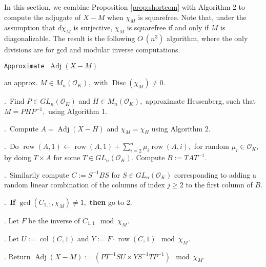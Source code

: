 \documentclass[sigconf]{acmart}
\DeclareMathOperator{\adj}{Adj}
\DeclareMathOperator{\disc}{Disc}
\DeclareMathOperator{\row}{row}
\DeclareMathOperator{\col}{col}
\newcommand{\OK}{\mathcal{O}_K}
\newcommand{\softO}{O\tilde{~}}
\theoremstyle{definition}
\begin{document}
In this section, we combine Proposition \ref{prop:shortcom}
with Algorithm 2 to compute the adjugate of $X{-}M$
when $\chi_M$ is squarefree.   Note that, under
the assumption that $d\chi_M$ is surjective,
$\chi_M$ is squarefree if and only if $M$ is diagonalizable.  The result is
the following $\softO(n^3)$ algorithm, where the only
divisions are for gcd and modular inverse computations.

\noindent\hrulefill

 {\tt Approximate $\adj (X{-}M)$ }

 an approx. $M \in M_n(\OK),$ with $\disc(\chi_M) \neq 0.$ 

\smallskip

.\ Find $P \in GL_n(\OK)$ and $H \in M_n(\OK),$ approximate Hessenberg,
such that $M=PHP^{-1},$ using Algorithm 1. 

.\ Compute $A=\adj (X-H)$ and $\chi_M = \chi_H$ using Algorithm 2.


.\ Do $\row(A,1) \leftarrow \row(A,1)+\sum_{i=2}^n \mu_i \row(A,i),$ for
random $\mu_i \in \OK,$ by doing $T \times A$ for some $T \in GL_n(\OK).$
Compute $B:=TAT^{-1}.$

.\ Similarily compute $C:=S^{-1}BS$ for $S \in GL_n(\OK)$ corresponding to
adding a random linear combination of the columns of index $j \ge 2$
to the first column of $B.$ 

.\  \textbf{If} $\gcd(C_{1,1}, \chi_M) \neq 1,$ \textbf{then} go to 2.

. Let $F$ be the inverse of $C_{1,1} \mod \chi_M$.

. Let $U := \col(C,1)$ and $Y := F \cdot \row(C,1) \mod \chi_M$.

. Return $\adj(X-M):=(PT^{-1}S U \times Y S^{-1} T P^{-1}) \mod \chi_M.$

\vspace{-1ex}\noindent\hrulefill

\medskip
\end{document}
